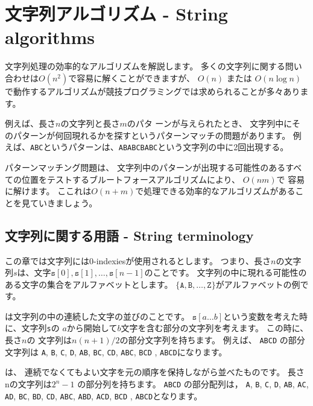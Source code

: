 \chapter{文字列アルゴリズム - String algorithms}


文字列処理の効率的なアルゴリズムを解説します。
多くの文字列に関する問い合わせは$O(n^2)$で容易に解くことができますが、
$O(n)$ または $O(n \log n)$ で動作するアルゴリズムが競技プログラミングでは求められることが多々あります。

例えば、長さ$n$の文字列と長さ$m$のパタ ーンが与えられたとき、
文字列中にそのパターンが何回現れるかを探すというパターンマッチの問題があります。
例えば、\texttt{ABC}というパターンは、\texttt{ABABCBABC}という文字列の中に2回出現する。

パターンマッチング問題は、
文字列中のパターンが出現する可能性のあるすべての位置をテストするブルートフォースアルゴリズムにより、
$O(nm)$で 容易に解けます。
ここれは$O(n + m)$で処理できる効率的なアルゴリズムがあることを見ていきましょう。


\section{文字列に関する用語 - String terminology}


この章では文字列には0-indexiesが使用されるとします。
つまり、長さ$n$の文字列$s$は、文字$\texttt{s}[0],\texttt{s}[1],\ldots,\texttt{s}[n-1]$のことです。
文字列の中に現れる可能性のある文字の集合をアルファベットとします。
$\{\texttt{A},\texttt{B},\ldots,\texttt{Z}\}$がアルファベットの例です。


は文字列の中の連続した文字の並びのことです。
$\texttt{s}[a \ldots b]$という変数を考えた時に、文字列\texttt{s}の
$a$から開始して$b$文字を含む部分の文字列を考えます。
この時に、長さ$n$の 文字列は$n(n+1)/2$の部分文字列を持ちます。
例えば、
\texttt{ABCD} の部分文字列は
\texttt{A}, \texttt{B}, \texttt{C}, \texttt{D},
\texttt{AB}, \texttt{BC}, \texttt{CD},
\texttt{ABC}, \texttt{BCD} , \texttt{ABCD}になります。


は、
連続でなくてもよい文字を元の順序を保持しながら並べたものです。
長さnの文字列は$2^n-1$ の部分列を持ちます。
\texttt{ABCD}  の部分配列は，
\texttt{A}, \texttt{B}, \texttt{C}, \texttt{D},
\texttt{AB}, \texttt{AC}, \texttt{AD},
\texttt{BC}, \texttt{BD}, \texttt{CD},
\texttt{ABC}, \texttt{ABD}, \texttt{ACD},
\texttt{BCD} , \texttt{ABCD}となります。

